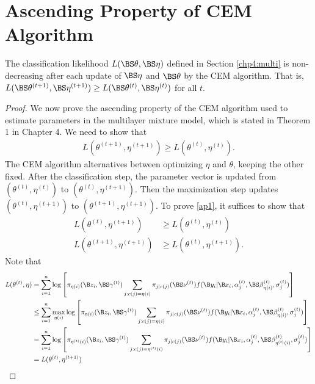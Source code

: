 \chapter{Ascending Property of CEM Algorithm}\label{append:2}
\begin{theorem} The classification likelihood $L(\BS\theta,\BS\eta)$ defined in Section \ref{chp4:multi} is non-decreasing after each update of $\BS\eta$ and $\BS\theta$ by the CEM algorithm. That is, $L(\BS\theta^{(t+1)},\BS\eta^{(t+1)}) \geq L(\BS\theta^{(t)},\BS\eta^{(t)})$ for all $t$.
\end{theorem}
\begin{proof}
We now prove the ascending property of the CEM algorithm used to estimate parameters in the multilayer mixture model, which is stated in Theorem 1 in Chapter 4. We need to show that
    \begin{align}\label{ap1}L(\theta^{(t+1)},\eta^{(t+1)})\geq L(\theta^{(t)},\eta^{(t)}).\end{align}
    The CEM algorithm alternatives between optimizing $\eta$ and $\theta$, keeping the other fixed. After the classification step, the parameter vector is updated from $(\theta^{(t)},\eta^{(t)})$ to $(\theta^{(t)},\eta^{(t+1)})$. Then the maximization step updates $(\theta^{(t)},\eta^{(t+1)})$ to $(\theta^{(t+1)},\eta^{(t+1)})$. To prove \ref{ap1}, it suffices to show that
    \begin{align*}
    L(\theta^{(t)},\eta^{(t+1)})&\geq L(\theta^{(t)},\eta^{(t)})\\
    L(\theta^{(t+1)},\eta^{(t+1)})&\geq L(\theta^{(t)},\eta^{(t+1)}).
    \end{align*}
    Note that 
    \begin{align*}
 L(\theta^{(t)},\eta)&=\sum^{n}_{i=1}\log\left[\pi_{\eta(i)}(\B z_{i},\BS \gamma^{(t)})\sum_{j:c(j)=\eta(i)}\pi_{j|c(j)}(\BS\nu^{(t)})f(\B y_{i}|\B x_{i},\alpha_{j}^{(t)},\BS\beta^{(t)}_{\eta(i)},\sigma^{(t)}_{j})\right]\\
 &\leq \sum^{n}_{i=1}\max_{\eta(i)}\log\left[\pi_{\eta(i)}(\B z_{i},\BS \gamma^{(t)})\sum_{j:c(j)=\eta(i)}\pi_{j|c(j)}(\BS\nu^{(t)})f(\B y_{i}|\B x_{i},\alpha_{j}^{(t)},\BS\beta^{(t)}_{\eta(i)},\sigma^{(t)}_{j})\right]\\
  &= \sum^{n}_{i=1}\log\left[\pi_{\eta^{(t)}(i)}(\B z_{i},\BS \gamma^{(t)})\sum_{j:c(j)=\eta^{(t)}(i)}\pi_{j|c(j)}(\BS\nu^{(t)})f(\B y_{i}|\B x_{i},\alpha_{j}^{(t)},\BS\beta^{(t)}_{\eta^{(t)}(i)},\sigma^{(t)}_{j})\right]\\
  &= L(\theta^{(t)},\eta^{(t+1)})
    \end{align*}

\end{proof}
